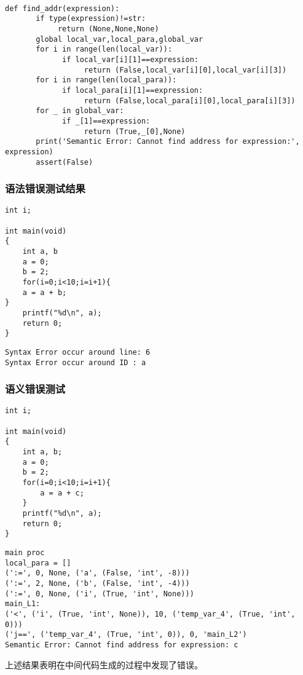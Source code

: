 \documentclass{article}
\begin{document}
\begin{verbatim}

def find_addr(expression):
       if type(expression)!=str:
            return (None,None,None)
       global local_var,local_para,global_var
       for i in range(len(local_var)):
             if local_var[i][1]==expression:
                  return (False,local_var[i][0],local_var[i][3])
       for i in range(len(local_para)):
             if local_para[i][1]==expression:
                  return (False,local_para[i][0],local_para[i][3])
       for _ in global_var:
             if _[1]==expression:
                  return (True,_[0],None) 
       print('Semantic Error: Cannot find address for expression:', expression)
       assert(False)

\end{verbatim}

\subsubsection{语法错误测试结果}

\begin{verbatim}
int i;

int main(void)
{
    int a, b
    a = 0;
    b = 2;
    for(i=0;i<10;i=i+1){
    a = a + b;
}
    printf("%d\n", a);
    return 0;
}
\end{verbatim}

\begin{verbatim}
Syntax Error occur around line: 6
Syntax Error occur around ID : a
\end{verbatim}

\subsubsection{语义错误测试}

\begin{verbatim}
int i;

int main(void)
{
    int a, b;
    a = 0;
    b = 2;
    for(i=0;i<10;i=i+1){
        a = a + c;
    }
    printf("%d\n", a);
    return 0;
}
\end{verbatim}

\begin{verbatim}
main proc
local_para = []
(':=', 0, None, ('a', (False, 'int', -8)))
(':=', 2, None, ('b', (False, 'int', -4)))
(':=', 0, None, ('i', (True, 'int', None)))
main_L1:
('<', ('i', (True, 'int', None)), 10, ('temp_var_4', (True, 'int', 0)))
('j==', ('temp_var_4', (True, 'int', 0)), 0, 'main_L2')
Semantic Error: Cannot find address for expression: c
\end{verbatim}

上述结果表明在中间代码生成的过程中发现了错误。
\end{document}
